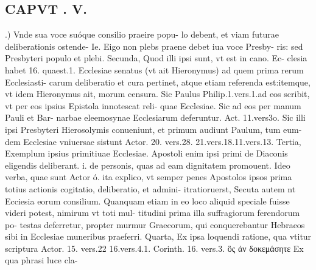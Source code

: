 \documentclass{article}
\begin{document}
\begin{pages}
\section*{CAPVT . V. }
\marginpar{[ p.353 ]}.) Vnde sua voce suóque consilio praeire popu- lo debent, et viam futurae deliberationis ostende- Ie. Eigo non plebs praene debet iua voce Presby- ris: sed Presbyteri populo et plebi.  \pend\pstart Secunda, Quod illi ipsi sunt, vt est in cano. Ec- clesia habet 16. quaest.1. Ecclesiae senatus (vt ait Hieronymus) ad quem prima rerum Ecclesiasti- carum deliberatio et cura pertinet, atque etiam referenda est:itemque, vt idem Hieronymus ait, morum censura. Sic Paulus Philip.1.vers.1.ad eos scribit, vt per eos ipsius Epistola innotescat reli- quae Ecclesiae. Sic ad eos per manum Pauli et Bar- narbae eleemosynae Ecclesiarum deferuntur. Act. 11.vers3o. Sic illi ipsi Presbyteri Hierosolymis conueniunt, et primum audiunt Paulum, tum eum- dem Ecclesiae vniuersae sistunt Actor. 20. vers.28. 21.vers.18.11.vers.13.  \pend\pstart Tertia, Exemplum ipsius primitiuae Ecclesiae. Apostoli enim ipsi primi de Diaconis eligendis deliberant. i. de personis, quas ad eam dignitatem promouent. Ideo verba, quae sunt Actor ó. ita explico, vt semper penes Apostolos ipsos prima totius actionis cogitatio, deliberatio, et admini- itratioruerst, Secuta autem nt Ecciesia eorum consilium. Quanquam etiam in eo loco aliquid speciale fuisse videri potest, nimirum vt toti mul- titudini prima illa suffragiorum ferendorum po- testas deferretur, propter murmur Graecorum, qui conquerebantur Hebraeos sibi in Ecclesiae muneribus praeferri.  \pend\pstart Quarta, Ex ipsa loquendi ratione, qua vtitur scriptura Actor. 15. vers.22 16.vers.4.1. Corinth. 16. vers.3. ὃς ἀν δοκεμάσητε Ex qua phrasi luce cla-  \pend

\end{pages}
\end{document}
